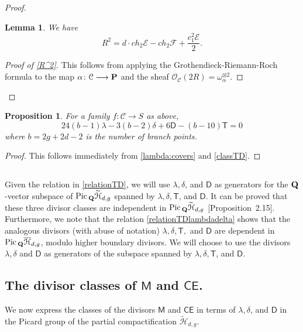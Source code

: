 \documentclass[reqno, 10 pt]{article}
\newtheorem{lem}[thm]{Lemma}
\newtheorem{prop}[thm]{Proposition}
\theoremstyle{definition}
\theoremstyle{remark}
\numberwithin{equation}{section}
\numberwithin{thm}{section}
\numberwithin{prop}{section}
\numberwithin{lem}{section}
\numberwithin{cor}{section}
\numberwithin{conj}{section}
\numberwithin{defn}{section}
\renewcommand{\H}{\mathcal H}
\newcommand{\td}{\widetilde}
\newcommand{\Hdgn}{\overline{\H}_{d,g}}
\renewcommand{\to}{\longrightarrow}
\newcommand{\sfT}{{\mathsf T}}
\newcommand{\sfD}{{\mathsf D}}
\newcommand{\sfCE}{{\mathsf {CE}}}
\newcommand{\sfM}{{\mathsf M}}
\newcommand{\cC}{{\mathcal C}}
\newcommand{\cE}{{\mathcal E}}
\newcommand{\cF}{{\mathcal F}}
\newcommand{\cO}{{\mathcal O}}
\newcommand {\Q}{{\bf Q}}
\renewcommand{\P}{{\bf P}}
\newcommand {\from}{{\colon}}
\renewcommand{\H}{{\mathcal{H}}}
\newcommand {\Pic}{{\rm Pic}\,}
\begin{document}
\begin{proof}
\begin{lem}\label{R^2}
We have 
\begin{equation}
R^{2} = d \cdot ch_{2}\cE - ch_{2}\cF + \frac{c_{1}^{2}\cE}{2}.
\end{equation}
\end{lem}
\begin{proof}[Proof of \autoref{R^2}]
This follows from applying the Grothendieck-Riemann-Roch formula to the map $\alpha \from \cC \to \P$ and the sheaf $\cO_{\cC}(2R) = \omega_{\alpha}^{\otimes 2}$. 
\end{proof}
\end{proof}

\begin{prop}\label{relationTD} For a family $f \from \cC \to S$ as above, 
\begin{equation}\label{relationTDlambdadelta}
24(b-1)\lambda - 3(b-2)\delta +  6\sfD - (b-10)\sfT = 0
\end{equation}
where $b = 2g+2d-2$ is the number of branch points.
\end{prop}

\begin{proof}
This follows immediately from \autoref{lambda:covers} and \autoref{classTD}.
\end{proof}

\subsection{}

Given the relation in \autoref{relationTD}, we will use $\lambda, \delta$, and $\sfD$ as generators for the $\Q$-vector subspace of ${\Pic}_{\Q}\td \H_{d,g}$ spanned by $\lambda, \delta, \sfT$, and $\sfD$. It can be proved that these three divisor classes are independent in ${\Pic}_{\Q}\td \H_{d,g}$ \cite{dp:pic_345}[Proposition~2.15].  Furthermore, we note that the relation \eqref{relationTDlambdadelta} shows that the analogous divisors (with abuse of notation) $\lambda, \delta, \sfT,$ and $\sfD$ are dependent in ${\Pic}_{\Q}\Hdgn$, modulo higher boundary divisors.  We will choose to use the divisors $\lambda, \delta$ and $\sfD$ as generators of the subspace spanned by $\lambda, \delta, \sfT$, and $\sfD$. 

\subsection{The divisor classes of $\sfM$ and $\sfCE$.}

We now express the classes of the divisors $\sfM$ and $\sfCE$ in terms of $\lambda, \delta$, and $\sfD$ in the Picard group of the partial compactification $\td \H_{d,g}$. 
\end{document}
